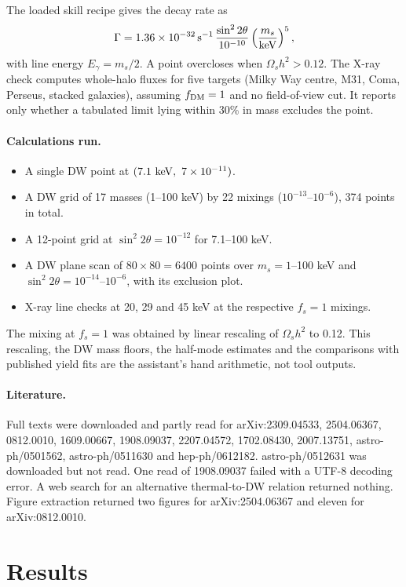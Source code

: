 \documentclass[11pt,a4paper]{article}
\begin{document}
The loaded skill recipe gives the decay rate as
\[
\Gamma=1.36\times10^{-32}\,{\rm s^{-1}}\,\frac{\sin^2 2\theta}{10^{-10}}\left(\frac{m_s}{\rm keV}\right)^5,
\]
with line energy $E_\gamma=m_s/2$. A point overcloses when $\Omega_s h^2>0.12$. The X-ray check computes whole-halo fluxes for five targets (Milky Way centre, M31, Coma, Perseus, stacked galaxies), assuming $f_{\rm DM}=1$ and no field-of-view cut. It reports only whether a tabulated limit lying within 30\% in mass excludes the point.

\paragraph{Calculations run.}
\begin{itemize}
\item A single DW point at $(7.1\ {\rm keV},\ 7\times10^{-11})$.
\item A DW grid of 17 masses (1--100 keV) by 22 mixings ($10^{-13}$--$10^{-6}$), 374 points in total.
\item A 12-point grid at $\sin^2 2\theta=10^{-12}$ for 7.1--100 keV.
\item A DW plane scan of $80\times80=6400$ points over $m_s=1$--100 keV and $\sin^2 2\theta=10^{-14}$--$10^{-6}$, with its exclusion plot.
\item X-ray line checks at 20, 29 and 45 keV at the respective $f_s=1$ mixings.
\end{itemize}
The mixing at $f_s=1$ was obtained by linear rescaling of $\Omega_s h^2$ to 0.12. This rescaling, the DW mass floors, the half-mode estimates and the comparisons with published yield fits are the assistant's hand arithmetic, not tool outputs.

\paragraph{Literature.}
Full texts were downloaded and partly read for arXiv:2309.04533, 2504.06367, 0812.0010, 1609.00667, 1908.09037, 2207.04572, 1702.08430, 2007.13751, astro-ph/0501562, astro-ph/0511630 and hep-ph/0612182. astro-ph/0512631 was downloaded but not read. One read of 1908.09037 failed with a UTF-8 decoding error. A web search for an alternative thermal-to-DW relation returned nothing. Figure extraction returned two figures for arXiv:2504.06367 and eleven for arXiv:0812.0010.

\section{Results}
\end{document}
